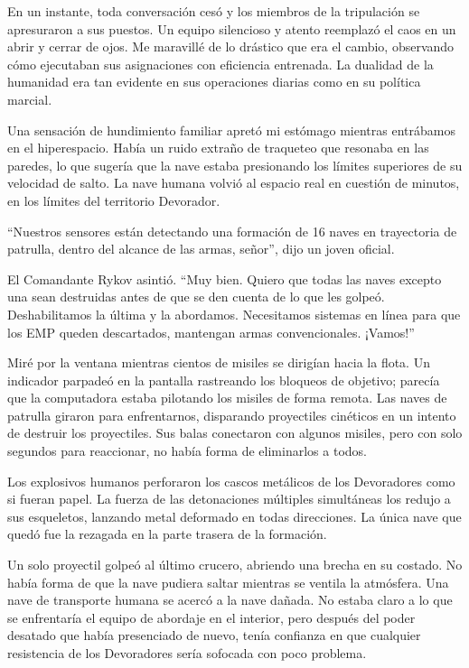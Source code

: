 \documentclass[spanish,12pt,a4paper,oneside,titlepage]{book}
\begin{document}
    En un instante, toda conversación cesó y los miembros de la tripulación se apresuraron a sus puestos. Un equipo silencioso y atento reemplazó el caos en un abrir y cerrar de ojos. Me maravillé de lo drástico que era el cambio, observando cómo ejecutaban sus asignaciones con eficiencia entrenada. La dualidad de la humanidad era tan evidente en sus operaciones diarias como en su política marcial.

    Una sensación de hundimiento familiar apretó mi estómago mientras entrábamos en el hiperespacio. Había un ruido extraño de traqueteo que resonaba en las paredes, lo que sugería que la nave estaba presionando los límites superiores de su velocidad de salto. La nave humana volvió al espacio real en cuestión de minutos, en los límites del territorio Devorador.

    ``Nuestros sensores están detectando una formación de 16 naves en trayectoria de patrulla, dentro del alcance de las armas, señor'', dijo un joven oficial.

    El Comandante Rykov asintió. ``Muy bien. Quiero que todas las naves excepto una sean destruidas antes de que se den cuenta de lo que les golpeó. Deshabilitamos la última y la abordamos. Necesitamos sistemas en línea para que los EMP queden descartados, mantengan armas convencionales. ¡Vamos!''

    Miré por la ventana mientras cientos de misiles se dirigían hacia la flota. Un indicador parpadeó en la pantalla rastreando los bloqueos de objetivo; parecía que la computadora estaba pilotando los misiles de forma remota. Las naves de patrulla giraron para enfrentarnos, disparando proyectiles cinéticos en un intento de destruir los proyectiles. Sus balas conectaron con algunos misiles, pero con solo segundos para reaccionar, no había forma de eliminarlos a todos.

    Los explosivos humanos perforaron los cascos metálicos de los Devoradores como si fueran papel. La fuerza de las detonaciones múltiples simultáneas los redujo a sus esqueletos, lanzando metal deformado en todas direcciones. La única nave que quedó fue la rezagada en la parte trasera de la formación.

    Un solo proyectil golpeó al último crucero, abriendo una brecha en su costado. No había forma de que la nave pudiera saltar mientras se ventila la atmósfera. Una nave de transporte humana se acercó a la nave dañada. No estaba claro a lo que se enfrentaría el equipo de abordaje en el interior, pero después del poder desatado que había presenciado de nuevo, tenía confianza en que cualquier resistencia de los Devoradores sería sofocada con poco problema.
\end{document}
